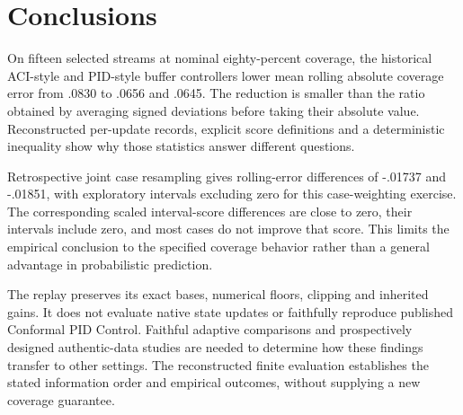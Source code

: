 \section{Conclusions}
On fifteen selected streams at nominal eighty-percent coverage, the historical ACI-style and PID-style buffer controllers lower mean rolling absolute coverage error from .0830 to .0656 and .0645. The reduction is smaller than the ratio obtained by averaging signed deviations before taking their absolute value. Reconstructed per-update records, explicit score definitions and a deterministic inequality show why those statistics answer different questions.

Retrospective joint case resampling gives rolling-error differences of -.01737 and -.01851, with exploratory intervals excluding zero for this case-weighting exercise. The corresponding scaled interval-score differences are close to zero, their intervals include zero, and most cases do not improve that score. This limits the empirical conclusion to the specified coverage behavior rather than a general advantage in probabilistic prediction.

The replay preserves its exact bases, numerical floors, clipping and inherited gains. It does not evaluate native state updates or faithfully reproduce published Conformal PID Control. Faithful adaptive comparisons and prospectively designed authentic-data studies are needed to determine how these findings transfer to other settings. The reconstructed finite evaluation establishes the stated information order and empirical outcomes, without supplying a new coverage guarantee.
